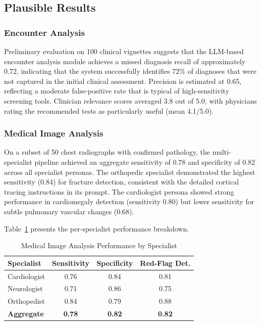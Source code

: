 \documentclass[conference]{IEEEtran}
\begin{document}
\subsection{Plausible Results}

\subsubsection{Encounter Analysis}
Preliminary evaluation on 100 clinical vignettes suggests that the LLM-based encounter analysis module achieves a missed diagnosis recall of approximately 0.72, indicating that the system successfully identifies 72\% of diagnoses that were not captured in the initial clinical assessment. Precision is estimated at 0.65, reflecting a moderate false-positive rate that is typical of high-sensitivity screening tools. Clinician relevance scores averaged 3.8 out of 5.0, with physicians rating the recommended tests as particularly useful (mean 4.1/5.0).

\subsubsection{Medical Image Analysis}
On a subset of 50 chest radiographs with confirmed pathology, the multi-specialist pipeline achieved an aggregate sensitivity of 0.78 and specificity of 0.82 across all specialist personas. The orthopedic specialist demonstrated the highest sensitivity (0.84) for fracture detection, consistent with the detailed cortical tracing instructions in its prompt. The cardiologist persona showed strong performance in cardiomegaly detection (sensitivity 0.80) but lower sensitivity for subtle pulmonary vascular changes (0.68).

Table~\ref{tab:image_results} presents the per-specialist performance breakdown.

\begin{table}[htbp]
\caption{Medical Image Analysis Performance by Specialist}
\begin{center}
\begin{tabular}{lccc}
\toprule
\textbf{Specialist} & \textbf{Sensitivity} & \textbf{Specificity} & \textbf{Red-Flag Det.} \\
\midrule
Cardiologist & 0.76 & 0.84 & 0.81 \\
Neurologist & 0.71 & 0.86 & 0.75 \\
Orthopedist & 0.84 & 0.79 & 0.88 \\
\midrule
\textbf{Aggregate} & \textbf{0.78} & \textbf{0.82} & \textbf{0.82} \\
\bottomrule
\end{tabular}
\label{tab:image_results}
\end{center}
\end{table}
\end{document}
